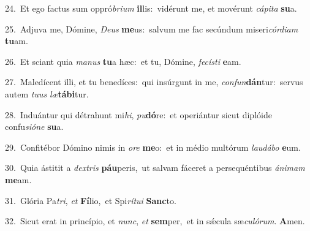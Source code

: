 {\numbfont\textcolor{\numbcolor}{24.}}~Et ego factus sum oppró\-\textit{bri}\-\textit{um} \textbf{il}\-lis:~\star vidérunt me, et movérunt \textit{cá}\-\textit{pi}\textit{ta} \textbf{su}\-a.\par
{\numbfont\textcolor{\numbcolor}{25.}}~Adjuva me, Dómine, \textit{De}\-\textit{us} \textbf{me}\-us:~\star salvum me fac secúndum miseri\-\textit{cór}\-\textit{di}\textit{am} \textbf{tu}\-am.\par
{\numbfont\textcolor{\numbcolor}{26.}}~Et sciant quia \textit{ma}\-\textit{nus} \textbf{tu}\-a hæc:~\star et tu, Dómine, \textit{fe}\-\textit{cís}\textit{ti} \textbf{e}\-am.\par
{\numbfont\textcolor{\numbcolor}{27.}}~Maledícent illi, et tu benedíces:~\dagger qui insúrgunt in me, \textit{con}\-\textit{fun}\textbf{dán}tur:~\star servus autem \textit{tu}\-\textit{us} \textit{læ}\-\textbf{tá}\textbf{bi}tur.\par
{\numbfont\textcolor{\numbcolor}{28.}}~Induántur qui détrahunt mi\-\textit{hi}\-, \textit{pu}\-\textbf{dó}re:~\star et operiántur sicut diplóide confu\-\textit{si}\-\textit{ó}\textit{ne} \textbf{su}\-a.\par
{\numbfont\textcolor{\numbcolor}{29.}}~Confitébor Dómino nimis in \textit{o}\-\textit{re} \textbf{me}\-o:~\star et in médio multórum \textit{lau}\-\textit{dá}\textit{bo} \textbf{e}\-um.\par
{\numbfont\textcolor{\numbcolor}{30.}}~Quia ástitit a \textit{dex}\-\textit{tris} \textbf{páu}\-peris,~\star ut salvam fáceret a persequéntibus \textit{á}\-\textit{ni}\textit{mam} \textbf{me}\-am.\par
{\numbfont\textcolor{\numbcolor}{31.}}~Glória Pa\-\textit{tri}\-, \textit{et} \textbf{Fí}\-lio,~\star et Spi\-\textit{rí}\-\textit{tu}\textit{i} \textbf{Sanc}\-to.\par
{\numbfont\textcolor{\numbcolor}{32.}}~Sicut erat in princípio, et \textit{nunc}\-, \textit{et} \textbf{sem}\-per,~\star et in sǽcula sæ\-\textit{cu}\-\textit{ló}\textit{rum}. \textbf{A}\-men.\par
